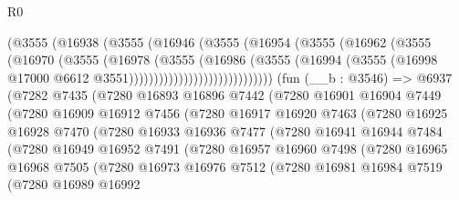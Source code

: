 \begin{lexlean}{R0}
\begin{coremodule}
                          (@3555
                            (@16938
                              (@3555
                                (@16946
                                  (@3555
                                    (@16954
                                      (@3555
                                        (@16962
                                          (@3555
                                            (@16970
                                              (@3555
                                                (@16978
                                                  (@3555
                                                    (@16986
                                                      (@3555
                                                        (@16994
                                                          (@3555
                                                            (@16998
                                                              @17000
                                                              @6612
                                                              @3551)))))))))))))))))))))))))))))
    (fun (__b : @3546) =>
    @6937
      (@7282
        @7435
        (@7280
          @16893
          @16896
          @7442
          (@7280
            @16901
            @16904
            @7449
            (@7280
              @16909
              @16912
              @7456
              (@7280
                @16917
                @16920
                @7463
                (@7280
                  @16925
                  @16928
                  @7470
                  (@7280
                    @16933
                    @16936
                    @7477
                    (@7280
                      @16941
                      @16944
                      @7484
                      (@7280
                        @16949
                        @16952
                        @7491
                        (@7280
                          @16957
                          @16960
                          @7498
                          (@7280
                            @16965
                            @16968
                            @7505
                            (@7280
                              @16973
                              @16976
                              @7512
                              (@7280
                                @16981
                                @16984
                                @7519
                                (@7280
                                  @16989
                                  @16992

\end{coremodule}
\end{lexlean}
